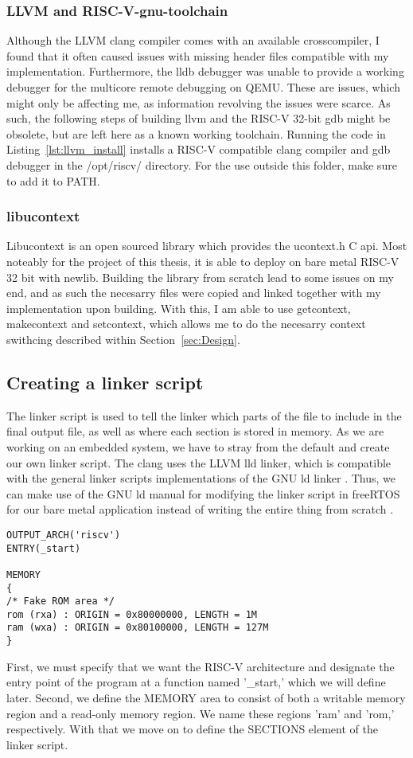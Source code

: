 \subsubsection*{LLVM and RISC-V-gnu-toolchain}
Although the LLVM clang compiler comes with an available crosscompiler, I found
that it often caused issues with missing header files compatible with my
implementation. Furthermore, the lldb debugger was unable to provide a working
debugger for the multicore remote debugging on QEMU. These are issues, which
might only be affecting me, as information revolving the issues were scarce. As
such, the following steps of building llvm and the RISC-V 32-bit gdb might be
obsolete, but are left here as a known working toolchain. Running the code in
Listing~\ref{lst:llvm_install} installs a RISC-V compatible clang compiler and
gdb debugger in the /opt/riscv/ directory. For the use outside this folder, make
sure to add it to PATH.

\subsubsection*{libucontext}
Libucontext is an open sourced library which provides the ucontext.h C api. Most
noteably for the project of this thesis, it is able to deploy on bare metal
RISC-V 32 bit with newlib. Building the library from scratch lead to some issues
on my end, and as such the necesarry files were copied and linked together with
my implementation upon building. With this, I am able to use getcontext,
makecontext and setcontext, which allows me to do the necesarry context
swithcing described within Section~\ref{sec:Design}.


\subsection{Creating a linker script}
The linker script is used to tell the linker which parts of the file to include
in the final output file, as well as where each section is stored in memory. As
we are working on an embedded system, we have to stray from the default and
create our own linker script. The clang uses the LLVM lld linker, which is
compatible with the general linker scripts implementations of the GNU ld linker
\cite{llvm-org-linker}. Thus, we can make use of the GNU ld manual for modifying
the linker script in freeRTOS for our bare metal application instead of writing
the entire thing from scratch \cite{GNU-linker}.

\begin{lstlisting}
OUTPUT_ARCH('riscv')
ENTRY(_start)

MEMORY
{
/* Fake ROM area */
rom (rxa) : ORIGIN = 0x80000000, LENGTH = 1M
ram (wxa) : ORIGIN = 0x80100000, LENGTH = 127M
}
\end{lstlisting}
First, we must specify that we want the RISC-V architecture and designate the entry point
of the program at a function named '\_start,' which we will define later.
Second, we define the MEMORY area to consist of both a writable memory region and a read-only
memory region. We name these regions 'ram' and 'rom,' respectively. With that we move on to define the SECTIONS element of the linker script.

